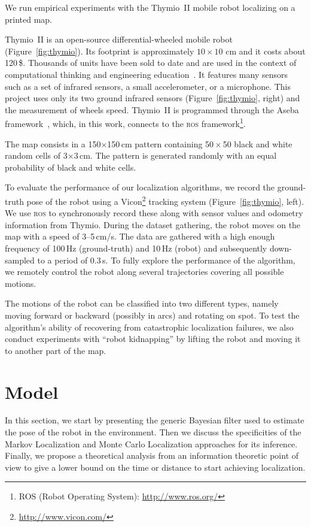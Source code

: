 \documentclass[letterpaper, 10pt, conference]{ieeeconf}
\newcommand{\fig}[1]{Figure~\ref{fig:#1}}
\begin{document}
We run empirical experiments with the Thymio~II mobile robot localizing on a printed map.

Thymio~II is an open-source differential-wheeled mobile robot (\fig{thymio}).
Its footprint is approximately $10 \times 10$ cm and it costs about 120\,\$.
Thousands of units have been sold to date and are used in the context of computational thinking and engineering education~\cite{riedo2015thymio}.
It features many sensors such as a set of infrared sensors, a small accelerometer, or a microphone.
This project uses only its two ground infrared sensors (\fig{thymio}, right) and the measurement of wheels speed.
Thymio~II is programmed through the Aseba framework~\cite{aseba2011tmech}, which, in this work, connects to the \textsc{ros} framework\footnote{ROS (Robot Operating System): \url{http://www.ros.org/}}.

The map consists in a 150$\times$150\,cm pattern containing 50\,$\times$\,50 black and white random cells of 3$\times$3\,cm.
The pattern is generated randomly with an equal probability of black and white cells.

To evaluate the performance of our localization algorithms, we record the ground-truth pose of the robot using a Vicon\footnote{\url{http://www.vicon.com/}} tracking system (\fig{thymio}, left).
We use \textsc{ros} to synchronously record these along with sensor values and odometry information from Thymio.
During the dataset gathering, the robot moves on the map with a speed of 3--5\,cm/s.
The data are gathered with a high enough frequency of 100\,Hz (ground-truth) and 10\,Hz (robot) and subsequently down-sampled to a period of 0.3\,s.
To fully explore the performance of the algorithm, we remotely control the robot along several trajectories covering all possible motions.

The motions of the robot can be classified into two different types, namely moving forward or backward (possibly in arcs) and rotating on spot.
To test the algorithm's ability of recovering from catastrophic localization failures, we also conduct experiments with ``robot kidnapping'' by lifting the robot and moving it to another part of the map.

\section{Model}

In this section, we start by presenting the generic Bayesian filter used to estimate the pose of the robot in the environment.
Then we discuss the specificities of the Markov Localization and Monte Carlo Localization approaches for its inference.
Finally, we propose a theoretical analysis from an information theoretic point of view to give a lower bound on the time or distance to start achieving localization.
\end{document}
